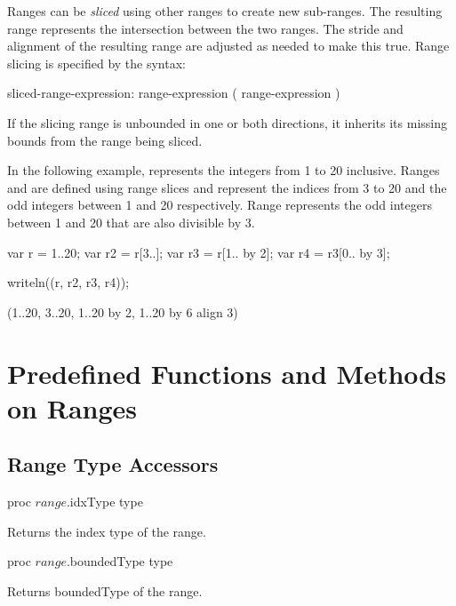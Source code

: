 Ranges can be \emph{sliced} using other ranges to create new
sub-ranges.  The resulting range represents the intersection between
the two ranges.  The stride and alignment of the resulting range are adjusted as
needed to make this true.  Range slicing is specified by the syntax:
\begin{syntax}
sliced-range-expression:
  range-expression ( range-expression )
\end{syntax}
\noindent If the slicing range is unbounded in one or both directions, it
inherits its missing bounds from the range being sliced.

\begin{example}
In the following example,  represents the integers from 1 to
20 inclusive.  Ranges  and  are defined using range
slices and represent the indices from 3 to 20 and the odd integers
between 1 and 20 respectively. Range  represents the odd
integers between 1 and 20 that are also divisible by 3.
\begin{chapelpre}
\end{chapelpre}
\begin{chapel}
var r = 1..20;
var r2 = r[3..];
var r3 = r[1.. by 2];
var r4 = r3[0.. by 3];
\end{chapel}
\begin{chapelpost}
writeln((r, r2, r3, r4));
\end{chapelpost}
\begin{chapeloutput}
(1..20, 3..20, 1..20 by 2, 1..20 by 6 align 3)
\end{chapeloutput}
\end{example}

\section{Predefined Functions and Methods on Ranges}

\subsection{Range Type Accessors}

\begin{protohead}
proc $range$.idxType type
\end{protohead}
\begin{protobody}
Returns the index type of the range.
\end{protobody}

\begin{protohead}
proc $range$.boundedType type
\end{protohead}
\begin{protobody}
Returns boundedType of the range.
\end{protobody}


